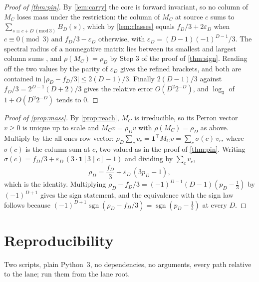 \documentclass[11pt]{amsart}
\theoremstyle{definition}
\theoremstyle{remark}
\begin{document}
\begin{proof}[Proof of \cref{thm:pin}]
By \cref{lem:carry} the core is forward invariant, so no column of $M_C$ loses mass under the restriction: the column of $M_C$ at source $c$ sums to $\sum_{s \equiv c + D \ (\mathrm{mod}\ 3)} B_D(s)$, which by \cref{lem:classes} equals $f_D/3 + 2\varepsilon_D$ when $c \equiv 0 \pmod 3$ and $f_D/3 - \varepsilon_D$ otherwise, with $\varepsilon_D = (D-1)(-1)^{D-1}/3$. The spectral radius of a nonnegative matrix lies between its smallest and largest column sums \cite[Theorem 8.1.22]{hornjohnson}, and $\rho(M_C) = \rho_D$ by Step 3 of the proof of \cref{thm:sign}. Reading off the two values by the parity of $\varepsilon_D$ gives the refined brackets, and both are contained in $\lvert \rho_D - f_D/3 \rvert \le 2(D-1)/3$. Finally $2(D-1)/3$ against $f_D/3 = 2^{D-1}(D+2)/3$ gives the relative error $O(D^2 2^{-D})$, and $\log_3$ of $1 + O(D^2 2^{-D})$ tends to $0$.
\end{proof}

\begin{proof}[Proof of \cref{prop:mass}]
By \cref{prop:reach}, $M_C$ is irreducible, so its Perron vector $v \ge 0$ is unique up to scale and $M_C v = \rho_D v$ with $\rho(M_C) = \rho_D$ as above. Multiply by the all-ones row vector: $\rho_D \sum_c v_c = \mathbf{1}^{\top} M_C v = \sum_c \sigma(c)\, v_c$, where $\sigma(c)$ is the column sum at $c$, two-valued as in the proof of \cref{thm:pin}. Writing $\sigma(c) = f_D/3 + \varepsilon_D\,(3 \cdot \mathbf 1[3 \mid c] - 1)$ and dividing by $\sum_c v_c$,
\[
\rho_D = \frac{f_D}{3} + \varepsilon_D\,(3p_D - 1),
\]
which is the identity. Multiplying $\rho_D - f_D/3 = (-1)^{D-1}(D-1)(p_D - \tfrac13)$ by $(-1)^{D+1}$ gives the sign statement, and the equivalence with the sign law follows because $(-1)^{D+1}\operatorname{sgn}(\rho_D - f_D/3) = \operatorname{sgn}(p_D - \tfrac13)$ at every $D$.
\end{proof}

\section{Reproducibility}

Two scripts, plain Python~3, no dependencies, no arguments, every path relative to the lane; run them from the lane root.
\end{document}
